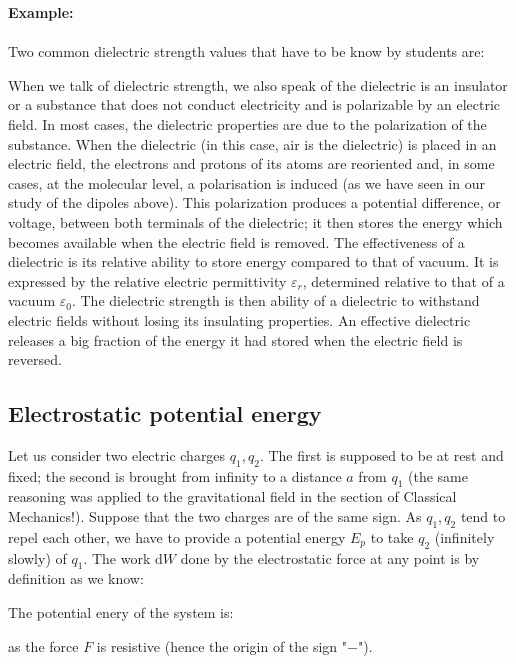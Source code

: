 	\begin{tcolorbox}[colframe=black,colback=white,sharp corners]
	\textbf{{\Large {}}Example:}\\\\
	Two common dielectric strength values that have to be know by students are:
	
	\end{tcolorbox}
	When we talk of dielectric strength, we also speak of the dielectric is an insulator or a substance that does not conduct electricity and is polarizable by an electric field. In most cases, the dielectric properties are due to the polarization of the substance. When the dielectric (in this case, air is the dielectric) is placed in an electric field, the electrons and protons of its atoms are reoriented and, in some cases, at the molecular level, a polarisation is induced (as we have seen in our study of the dipoles above). This polarization produces a potential difference, or voltage, between both terminals of the dielectric; it then stores the energy which becomes available when the electric field is removed. The effectiveness of a dielectric is its relative ability to store energy compared to that of vacuum. It is expressed by the relative electric permittivity $\varepsilon_r$, determined relative to that of a vacuum $\varepsilon_0$. The dielectric strength is then ability of a dielectric to withstand electric fields without losing its insulating properties. An effective dielectric releases a big fraction of the energy it had stored when the electric field is reversed.
	
	\subsection{Electrostatic potential energy}\label{electrostatic potential energy}
	Let us consider two electric charges $q_1,q_2$. The first is supposed to be at rest and fixed; the second is brought from infinity to a distance $a$ from $q_1$ (the same reasoning was applied to the gravitational field in the section of Classical Mechanics!). Suppose that the two charges are of the same sign. As $q_1,q_2$ tend to repel each other, we have to provide a potential energy $E_p$ to take $q_2$ (infinitely slowly) of $q_1$. The work $\mathrm{d}W$ done by the electrostatic force at any point is by definition as we know:
	
	The potential enery of the system is:
	
	as the force $F$ is resistive (hence the origin of the sign "$-$").


